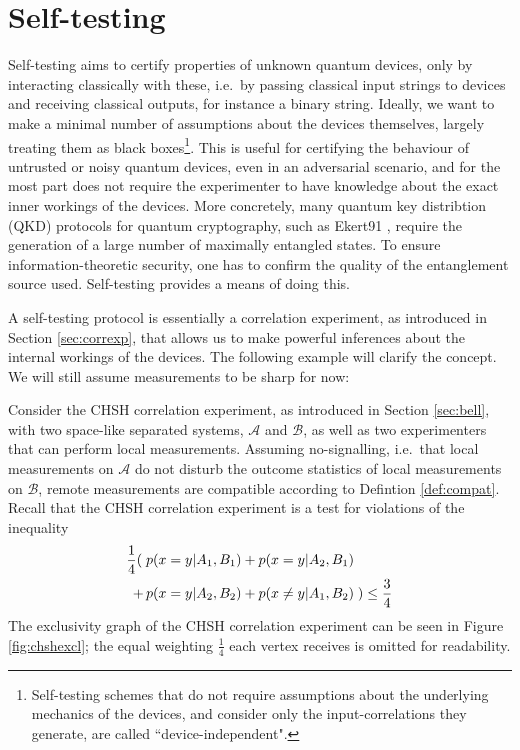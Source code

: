 \chapter{Self-testing}
\label{sec:self-testing}

Self-testing aims to certify properties of unknown quantum devices, only by interacting classically with these, i.e.\ by passing classical input strings to devices and receiving classical outputs, for instance a binary string. Ideally, we want to make a minimal number of assumptions about the devices themselves, largely treating them as black boxes\footnote{Self-testing schemes that do not require assumptions about the underlying mechanics of the devices, and consider only the input-correlations they generate, are called ``device-independent".}. This is useful for certifying the behaviour of untrusted or noisy quantum devices, even in an adversarial scenario, and for the most part does not require the experimenter to have knowledge about the exact inner workings of the devices. 
More concretely, many quantum key distribtion (QKD) protocols for quantum cryptography, such as Ekert91 \cite{Ekert91}, require the generation of a large number of maximally entangled states. To ensure information-theoretic security, one has to confirm the quality of the entanglement source used. Self-testing provides a means of doing this.

A self-testing protocol is essentially a correlation experiment, as introduced in Section \ref{sec:correxp}, that allows us to make powerful inferences about the internal workings of the devices. The following example will clarify the concept. We will still assume measurements to be sharp for now:

Consider the CHSH correlation experiment, as introduced in Section \ref{sec:bell}, with two space-like separated systems, $\mathcal{A}$ and $\mathcal{B}$, as well as two experimenters that can perform local measurements. Assuming no-signalling, i.e.\ that local measurements on $\mathcal{A}$ do not disturb the outcome statistics of local measurements on $\mathcal{B}$, remote measurements are compatible according to Defintion \ref{def:compat}. Recall that the CHSH correlation experiment is a test for violations of the inequality
\begin{align*}
    \frac{1}{4}(\; & p(x=y\vert A_1,B_1)+p(x=y\vert A_2,B_1)\\ +\thinspace&p(x=y\vert A_2,B_2)+p(x\neq y \vert A_1,B_2) \;)\leq \frac{3}{4}
\end{align*}
The exclusivity graph of the CHSH correlation experiment can be seen in Figure \ref{fig:chshexcl}; the equal weighting $\frac{1}{4}$ each vertex receives is omitted for readability. 

